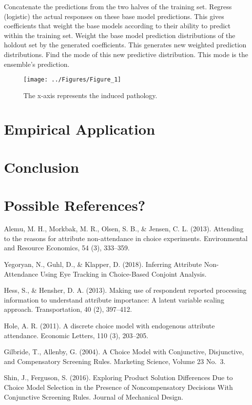 \documentclass[12pt,titlepage]{mktg-article}
\begin{document}
Concatenate the predictions from the two halves of the training set. Regress (logistic) the actual responses on these base model predictions. This gives coefficients that weight the base models according to their ability to predict within the training set. Weight the base model prediction distributions of the holdout set by the generated coefficients. This generates new weighted prediction distributions. Find the mode of this new predictive distribution. This mode is the ensemble's prediction.

\begin{figure}

{\centering \texttt{[image: ../Figures/Figure\_1]} 

}

\caption{The x-axis represents the induced pathology.}\label{fig:ensemble-relative}
\end{figure}

\hypertarget{empirical-application}{%
\section{Empirical Application}\label{empirical-application}}

\hypertarget{conclusion}{%
\section{Conclusion}\label{conclusion}}

\hypertarget{possible-references}{%
\section{Possible References?}\label{possible-references}}

Alemu, M. H., Morkbak, M. R., Olsen, S. B., \& Jensen, C. L. (2013). Attending to the reasons for attribute non-attendance in choice experiments. Environmental and Resource Economics, 54 (3), 333--359.

Yegoryan, N., Guhl, D., \& Klapper, D. (2018). Inferring Attribute Non-Attendance Using Eye Tracking in Choice-Based Conjoint Analysis.

Hess, S., \& Hensher, D. A. (2013). Making use of respondent reported processing information
to understand attribute importance: A latent variable scaling approach. Transportation, 40 (2), 397--412.

Hole, A. R. (2011). A discrete choice model with endogenous attribute attendance. Economic
Letters, 110 (3), 203--205.

Gilbride, T., Allenby, G. (2004). A Choice Model with Conjunctive, Disjunctive, and Compensatory Screening Rules. Marketing Science, Volume 23 No.~3.

Shin, J., Ferguson, S. (2016). Exploring Product Solution Differences Due to Choice Model Selection in the Presence of Noncompensatory Decisions With Conjunctive Screening Rules. Journal of Mechanical Design.

\pagebreak


\end{document}
